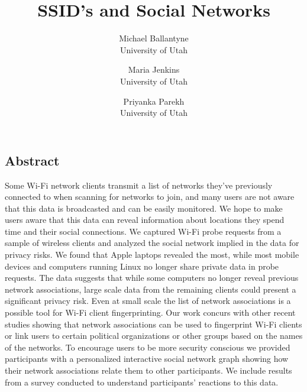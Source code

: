 \documentclass[letterpaper,twocolumn,10pt]{article}
\begin{document}
\date{}

\title{\Large \bf SSID's and Social Networks}

\author{
{\rm Michael Ballantyne}\\
University of Utah
\and
{\rm Maria Jenkins}\\
University of Utah
\and
{\rm Priyanka Parekh}\\
University of Utah
} 

\maketitle

\thispagestyle{empty}


\subsection*{Abstract}
Some Wi-Fi network clients transmit a list of networks they've
previously connected to when scanning for networks to join, and many
users are not aware that this data is broadcasted and can be easily
monitored. We hope to make users aware that this data can reveal
information about locations they spend time and their social
connections. We captured Wi-Fi probe requests from a sample of
wireless clients and analyzed the social network implied in the data
for privacy risks. We found that Apple laptops revealed the most,
while most mobile devices and computers running Linux no longer share
private data in probe requests. The data suggests that while some
computers no longer reveal previous network associations, large scale
data from the remaining clients could present a significant privacy
risk. Even at small scale the list of network associations is a
possible tool for Wi-Fi client fingerprinting. Our work concurs with
other recent studies showing that network associations can be used to
fingerprint Wi-Fi clients or link users to certain political organizations or other groups based on the names of the networks. To encourage
users to be more security conscious we provided participants with a
personalized interactive social network graph showing how their
network associations relate them to other participants. We include
results from a survey conducted to understand participants' reactions
to this data.
\end{document}
